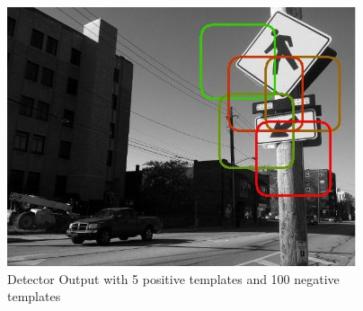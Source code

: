 \documentclass[11pt,psfig]{article}
\begin{document}
\begin{figure}[H]
\centering
\includegraphics[height=3in]{prob5_a3plot1.jpg}
\caption{Detector Output with 5 positive templates and 100 negative templates}
\end{figure}
\end{document}
